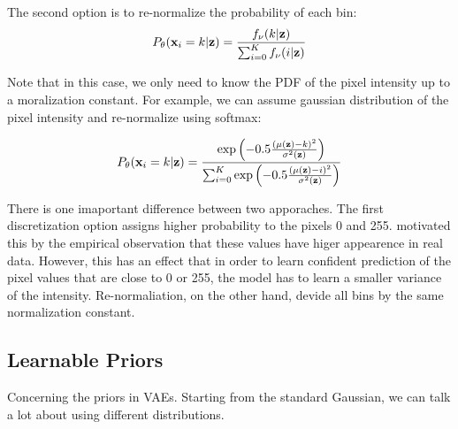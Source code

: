The second option is to re-normalize the probability of each bin:
\begin{equation}
\begin{aligned}
    P_{\theta}({\mathbf{x}}_i = k|{\mathbf{z}}) = \frac{f_{\nu}(k|{\mathbf{z}})}{\sum_{i=0}^K f_{\nu}(i|{\mathbf{z}})}
\end{aligned}
\end{equation}

Note that in this case, we only need to know the PDF of the pixel intensity up to a moralization constant. For example, we can assume gaussian distribution of the pixel intensity and re-normalize using softmax:

\begin{equation}
\begin{aligned}
    P_{\theta}({\mathbf{x}}_i = k|{\mathbf{z}}) = \frac{\exp\left(-0.5 \frac{\left(\mu({\mathbf{z}}) - k\right)^2}{\sigma^2({\mathbf{z}})}\right)}{\sum_{i=0}^K \exp\left(-0.5 \frac{\left(\mu({\mathbf{z}}) - i\right)^2}{\sigma^2({\mathbf{z}})}\right)}
\end{aligned}
\end{equation}

There is one imaportant difference between two apporaches. The first discretization option assigns higher probability to the pixels 0 and 255. \citet{salimans2016improved} motivated this by the empirical observation that these values have higer appearence in real data. However, this has an effect that in order to learn confident prediction of the pixel values that are close to 0 or 255, the model has to learn a smaller variance of the intensity. Re-normaliation, on the other hand, devide all bins by the same normalization constant.














\subsection{Learnable Priors}


Concerning the priors in VAEs. Starting from the standard Gaussian, we can talk a lot about using different distributions. 

